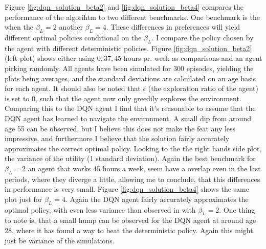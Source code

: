 Figure \ref{fig:dqn_solution_beta2} and \ref{fig:dqn_solution_beta4} compares the performance of the algorihtm to two different benchmarks. One benchmark is the when the $\beta_L = 2$ another $\beta_L=4$. These differences in preferences will yield different optimal policies conditional on the $\beta_L$. I compare the policy chosen by the agent with different deterministic policies. Figure \ref{fig:dqn_solution_beta2} (left plot) shows either using $0, 37, 45$ hours pr. week as comparisons and an agent picking randomly. All agents have been simulated for 300 episodes, yielding the plots being averages, and the standard deviations are calculated on an age basis for each agent. It should also be noted that $\epsilon$ (the exploration ratio of the agent) is set to 0, such that the agent now only greedily explores the environment. Comparing this to the DQN agent I find that it's reasonable to assume that the DQN agent has learned to navigate the environment. A small dip from around age 55 can be observed, but I believe this does not make the feat any less impressive, and furthermore I believe that the solution fairly accurately approximates the correct optimal policy. Looking to the the right hands side plot, the variance of the utility (1 standard deviation). Again the best benchmark for $\beta_L = 2$ an agent that works 45 hours a week, seem have a overlap even in the last periods, where they diverge a little, allowing me to conclude, that this differences in performance is very small. Figure \ref{fig:dqn_solution_beta4} shows the same plot just for $\beta_L = 4$. Again the DQN agent fairly accurately approximates the optimal policy, with even less variance than observed in with $\beta_L = 2$. One thing to note is, that a small hump can be observed for the DQN agent at around age 28, where it has found a way to beat the deterministic policy. Again this might just be variance of the simulations. 


